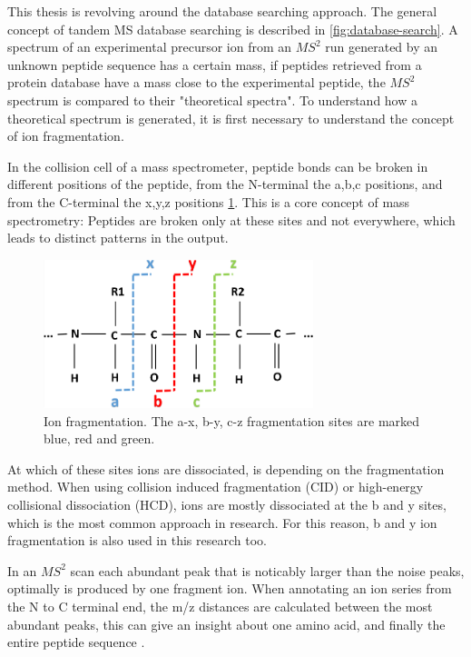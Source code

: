\documentclass[11pt]{article}
\begin{document}
This thesis is revolving around the database searching approach. The general concept of tandem MS database searching is described in \cref{fig:database-search}. A spectrum of an experimental precursor ion from an \(MS^2\) run generated by an unknown peptide sequence has a certain mass, if peptides retrieved from a protein database have a mass close to the experimental peptide, the \(MS^2\) spectrum is compared to their "theoretical spectra". To understand how a theoretical spectrum is generated, it is first necessary to understand the concept of ion fragmentation. 

In the collision cell of a mass spectrometer, peptide bonds can be broken in different positions of the peptide, from the N-terminal the a,b,c positions, and from the C-terminal the x,y,z positions \cref{fig:ion-frag}. This is a core concept of mass spectrometry: Peptides are broken only at these sites and not everywhere, which leads to distinct patterns in the output.
\begin{figure}[ht]
\centering
\includegraphics[width=0.7\textwidth]{figs/ion-frag.png}
\caption{Ion fragmentation. The a-x, b-y, c-z fragmentation sites are marked blue, red and green. \cite{ion-frag}}
\label{fig:ion-frag}
\end{figure}
At which of these sites ions are dissociated, is depending on the fragmentation method. When using collision induced fragmentation (CID) or high-energy collisional dissociation (HCD), ions are mostly dissociated at the b and y sites, which is the most common approach in research. For this reason, b and y ion fragmentation is also used in this research too. 

In an \(MS^2\) scan each abundant peak that is noticably larger than the noise peaks, optimally is produced by one fragment ion. When annotating an ion series from the N to C terminal end, the m/z distances are calculated between the most abundant peaks, this can give an insight about one amino acid, and finally the entire peptide sequence \cite{b-y-ions}.
\end{document}
